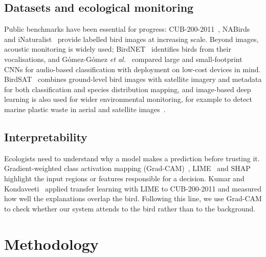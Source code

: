 \documentclass[conference]{IEEEtran}
\begin{document}
\subsection{Datasets and ecological monitoring}
Public benchmarks have been essential for progress: CUB-200-2011~\cite{wah2011},
NABirds~\cite{vanhorn2015} and iNaturalist~\cite{vanhorn2018} provide labelled
bird images at increasing scale. Beyond images, acoustic monitoring is widely
used; BirdNET~\cite{kahl2021} identifies birds from their vocalisations, and
G\'omez-G\'omez \emph{et al.}~\cite{gomez2022} compared large and small-footprint
CNNs for audio-based classification with deployment on low-cost devices in mind.
BirdSAT~\cite{sastry2024} combines ground-level bird images with satellite
imagery and metadata for both classification and species distribution mapping,
and image-based deep learning is also used for wider environmental monitoring,
for example to detect marine plastic waste in aerial and satellite
images~\cite{puppala2025plastic}.

\subsection{Interpretability}
Ecologists need to understand why a model makes a prediction before trusting it.
Gradient-weighted class activation mapping (Grad-CAM)~\cite{selvaraju2017},
LIME~\cite{ribeiro2016} and SHAP~\cite{lundberg2017} highlight the input regions or
features responsible for a decision. Kumar and Kondaveeti~\cite{kumar2024} applied
transfer learning with LIME to CUB-200-2011 and measured how well the explanations
overlap the bird. Following this line, we use Grad-CAM to check whether our system
attends to the bird rather than to the background.

\section{Methodology}\label{sec:method}
\end{document}
